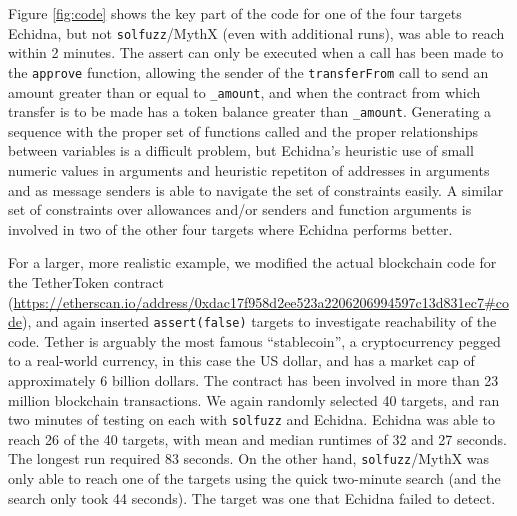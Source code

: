   Figure \ref{fig:code} shows the key part of the code for one of the four targets Echidna, but not {\tt solfuzz}/MythX (even with additional runs), was able to reach within 2 minutes.  The assert can only be executed when a call has been made to the {\tt approve} function, allowing the sender of the {\tt transferFrom} call to send an amount greater than or equal to {\tt \_amount}, and when  the contract from which transfer is to be made has a token balance greater than {\tt \_amount}.  Generating a sequence with the proper set of functions called and the proper relationships between variables is a difficult problem, but Echidna's heuristic use of small numeric values in arguments and heuristic repetiton of addresses in arguments and as message senders is able to navigate the set of constraints easily.  A similar set of constraints over allowances and/or senders and function arguments is involved in two of the other four targets where Echidna performs better.

For a larger, more realistic example, we modified the actual blockchain code for the TetherToken contract (\url{https://etherscan.io/address/0xdac17f958d2ee523a2206206994597c13d831ec7#code}), and again inserted {\tt assert(false)} targets to investigate reachability of the code.  Tether is arguably the most famous ``stablecoin'', a cryptocurrency pegged to a real-world currency, in this case the US dollar, and has a market cap of approximately 6 billion dollars.  The contract has been involved in more than 23 million blockchain transactions.
We again randomly selected 40 targets, and ran two minutes of testing on each with {\tt solfuzz} and Echidna.  Echidna was able to reach 26 of the 40 targets, with mean and median runtimes of 32 and 27 seconds.  The longest run required 83 seconds.  On the other hand, {\tt solfuzz}/MythX was only able to reach one of the targets using the quick two-minute search (and the search only took 44 seconds).   The target was one that Echidna failed to detect.